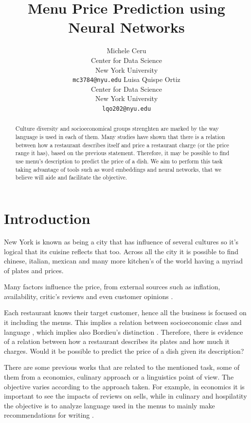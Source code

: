 \documentclass[11pt,letterpaper]{article}
\title{Menu Price Prediction using Neural Networks}
\author{Michele Ceru \\
	    Center for Data Science\\
		New York University\\
	    {\tt mc3784@nyu.edu}
	  \And
	Luisa Quispe Ortiz\\
  	Center for Data Science \\
  	New York University\\
  {\tt lqo202@nyu.edu}}
\date{}
\begin{document}
\maketitle

\begin{abstract}
Culture diversity and socioeconomical groups strenghten are marked by the way language is used in each of them.
Many studies have shown that there is a relation between how a restaurant describes itself and price a restaurant charge (or the price range it has), based on the previous statement. Therefore, it may be possible to find use menu's description to predict the price of a dish. We aim  to perform this task taking advantage of tools such as word embeddings and neural networks, that we believe will aide and facilitate the objective.
\end{abstract}

\section{Introduction}

New York is known as being a city that has influence of several cultures so it's logical that its cuisine reflects that too. Across all the city it is possible to find chinese, italian, mexican and many more kitchen’s of the world having a myriad of plates and prices.

Many factors influence the price, from external sources such as inflation, availability, critic’s reviews and even customer opinions \cite{jurafsky2014language}.

Each restaurant knows their target customer, hence all the business is focused on it including the menus. This implies a relation between socioeconomic class and language \cite{freedman2011authenticity}, which implies also Bordieu's distinction \cite{jurafsky2016bordieu}. Therefore, there is evidence of a relation between how a restaurant describes its plates and how much it charges. Would it be possible to predict the price of a dish given its description?

There are some previous works that are related to the mentioned task, some of them from a economics, culinary approach or a linguistics point of view. The objective varies according to the approach taken. For example, in economics it is important to see the impacts of reviews on sells, while in culinary and hospilatity the objective is to analyze language used in the menus to mainly make recommendations for writing \cite{chahuneau2012word}.
\end{document}
